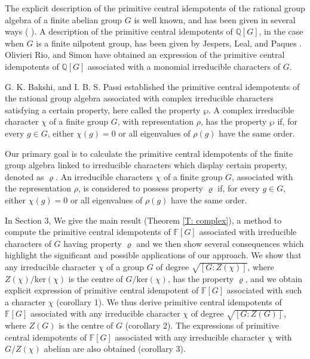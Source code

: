 \documentclass[12pt, reqno]{amsart}
\numberwithin{equation}{section}
\theoremstyle{definition}
\theoremstyle{remark}
\theoremstyle{plain}
\begin{document}
The explicit description of the primitive central idempotents of the rational group algebra of a finite abelian group $G$ is well known, and has been given in several ways (\cite{Ayoub} \cite{Goodaire} \cite{Jespers} \cite{Olivieri}). A description of the primitive central idempotents of $\mathbb{Q}[G]$, in the case when $G$ is a finite nilpotent group, has been given by Jespers, Leal, and Paques \cite{Jespers}. Olivieri Rio, and Simon \cite{Olivieri} have obtained an expression of the primitive central idempotents of $\mathbb{Q}[G]$ associated with a monomial irreducible characters of $G$.\smallskip

G. K. Bakshi, and I. B. S. Passi \cite{Bakshi}  established the primitive central idempotents of the rational group algebra associated with complex irreducible characters satisfying a certain property, here called the property $\wp$. A complex irreducible character $\chi$ of a finite group $G$, with representation $\rho$, has the property $\wp$ if, for every $g\in G$, either $\chi(g)=0$ or all eigenvalues of $\rho(g)$ have the same order.\smallskip

Our primary goal is to calculate the primitive central idempotents of the finite group algebra linked to irreducible characters which display certain property, denoted as $\varrho$. An irreducible characters $\chi$ of a finite group $G$, associated with the representation $\rho$, is considered to possess property $\varrho$ if, for every $g\in G$, either $\chi(g)=0$ or all eigenvalues of $\rho(g)$ have the same order.\smallskip

In Section 3, We give the main result (Theorem \ref{T: complex}), a method to compute the primitive central idempotents of $\mathbb{F}[G]$ associated with irreducible characters of $G$ having property $\varrho$ and we then show several consequences which highlight the significant and possible applications of our approach. We show that any irreducible character $\chi$ of a group $G$ of degree $\sqrt{[G:Z(\chi)]}$, where $Z(\chi)/\text{ker}(\chi)$ is the centre of $G/\text{ker}(\chi)$, has the property $\varrho$, and we obtain explicit expression of primitive central idempotent of $\mathbb{F}[G]$ associated with such a character $\chi$ (corollary 1). We thus derive primitive central idempotents of $\mathbb{F}[G]$ associated with any irreducible character $\chi$ of degree $\sqrt{[G:Z(G)]}$, where $Z(G)$ is the centre of $G$ (corollary 2). The expressions of primitive central idempotents of $\mathbb{F}[G]$ associated with any irreducible character $\chi$ with $G/Z(\chi)$ abelian are also obtained (corollary 3).\smallskip
\end{document}
